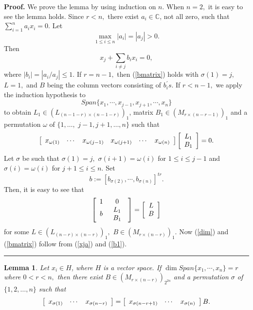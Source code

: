 \documentclass{article}%
\newtheorem{lemma}[theorem]{Lemma}
\newenvironment{proof}[1][Proof]{\noindent\textbf{#1.} }{\ \rule{0.5em}{0.5em}}
\begin{document}
\begin{proof}
We prove the lemma by using induction on $n.$ When $n=2,$ it is easy to see
the lemma holds. Since $r<n,$ there exist $a_{i}\in\mathbb{C}$, not all zero,
such that $\sum_{i=1}^{n}a_{i}x_{i}=0.$ Let
\[
\max_{1\leq i\leq n}\left\vert a_{i}\right\vert =\left\vert a_{j}\right\vert
>0.
\]
Then%
\begin{equation}
x_{j}+\sum_{i\neq j}b_{i}x_{i}=0, \label{xja}%
\end{equation}
where $\left\vert b_{i}\right\vert =\left\vert a_{i}/a_{j}\right\vert \leq1.$
If $r=n-1,$ then (\ref{bmatrix}) holds with $\sigma(1)=j,$ $L=1,$ and $B$
being the column vectors consisting of $b_{i}^{\prime}s.$ If $r<n-1,$ we apply
the induction hypothesis to
\[
Span\{x_{1},\cdots,x_{j-1},x_{j+1},\cdots,x_{n}\}
\]
to obtain $L_{1}\in\left(  L_{(n-1-r)\times(n-1-r)}\right)  _{1}$, matrix
$B_{1}\in\left(  M_{r\times(n-r-1)}\right)  _{1}$ and a permutation $\omega$
of $\{1,\ldots,$ $j-1,j+1,\ldots,n\}$ such that%
\begin{equation}
\left[
\begin{array}
[c]{cccccc}%
x_{\omega(1)} & \cdots & x_{\omega(j-1)} & x_{\omega(j+1)} & \cdots &
x_{\omega(n)}%
\end{array}
\right]  \left[
\begin{array}
[c]{c}%
L_{1}\\
B_{1}%
\end{array}
\right]  =0. \label{b1}%
\end{equation}
Let $\sigma$ be such that $\sigma(1)=j,$ $\sigma(i+1)=\omega(i)$ for $1\leq
i\leq j-1$ and $\sigma(i)=\omega(i)$ for $j+1\leq i\leq n$. Set%
\[
b:=\left[  b_{\sigma(2)},\cdots,b_{\sigma(n)}\right]  ^{tr}.
\]
Then, it is easy to see that
\[
\left[
\begin{array}
[c]{cc}%
1 & 0\\
b &
\begin{array}
[c]{c}%
L_{1}\\
B_{1}%
\end{array}
\end{array}
\right]  =\left[
\begin{array}
[c]{c}%
L\\
B
\end{array}
\right]
\]
for some $L\in\left(  L_{(n-r)\times(n-r)}\right)  _{1},$ $B\in\left(
M_{r\times(n-r)}\right)  _{1}.$ Now (\ref{dim}) and (\ref{bmatrix}) follow
from (\ref{xja}) and (\ref{b1}).
\end{proof}

\begin{lemma}
\label{xy2}Let $x_{i}\in H$, where $H$ is a vector space. If $\dim
Span\{x_{1},\cdots,x_{n}\}=r$ where $0<r<n,$ then there exist $B\in\left(
M_{r\times(n-r)}\right)  _{2^{2n}}$ and a permutation $\sigma$ of
$\{1,2,\ldots,n\}$ such that%
\[
\left[
\begin{array}
[c]{ccc}%
x_{\sigma(1)} & \cdots & x_{\sigma(n-r)}%
\end{array}
\right]  =\left[
\begin{array}
[c]{ccc}%
x_{\sigma(n-r+1)} & \cdots & x_{\sigma(n)}%
\end{array}
\right]  B.
\]

\end{lemma}
\end{document}
